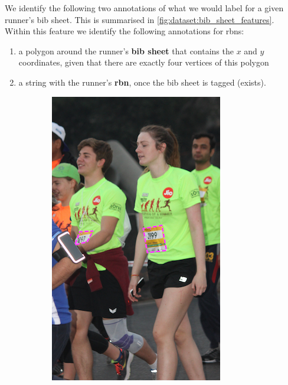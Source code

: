 We identify the following two annotations of what we would label for a given runner's bib sheet. This is summarised in \cref{fig:dataset:bib_sheet_features}. Within this feature we identify the following annotations for \glspl{rbn}:

\begin{enumerate}
  \item a polygon around the runner's \textbf{bib sheet} that contains the $x$ and $y$ coordinates, given that there are exactly four vertices of this polygon
  \item a string with the runner's \textbf{\gls{rbn}}, once the bib sheet is tagged (exists).
\end{enumerate}

\begin{figure}[p]
  \centering
  \hspace{\fill}
  \begin{subfigure}[b]{0.25\textwidth}
    \includegraphics[width=\textwidth]{images/dataset/BibSheet_Detection}

\end{subfigure}
\end{figure}
